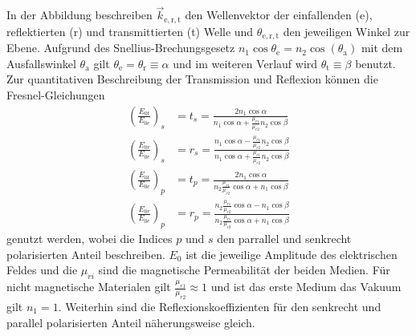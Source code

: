 In der Abbildung beschreiben $\vec{k}_\mathrm{e,r,t}$ den Wellenvektor der einfallenden (e), reflektierten (r) und transmittierten (t) Welle und $\theta_\mathrm{e,r,t}$ den jeweiligen Winkel zur Ebene.
Aufgrund des Snellius-Brechungsgesetz $n_1 \cos {\theta_\mathrm{e}} = n_2 \cos (\theta_\mathrm{a}) $ mit dem Ausfallswinkel $\theta_\mathrm{a}$ gilt $\theta_\mathrm{e} = \theta_\mathrm{r} \equiv \alpha$ und im weiteren Verlauf wird $\theta_\mathrm{t} \equiv \beta$ benutzt. Zur quantitativen Beschreibung der Transmission und Reflexion können die Fresnel-Gleichungen
\begin{align}
  \left( \frac{E_{0t}}{E_{0e}} \right)_{s}&=t_{s}=\frac{2 n _{1}\cos \alpha }{n_{1}\cos \alpha +\frac{\mu _{r1}}{\mu _{r2}}n_{2}\cos \beta }\\
  \left( \frac{E_{0r}}{E_{0e}} \right)_{s}&=r_{s}=\frac{n_{1}\cos \alpha -\frac{\mu _{r1}}{\mu _{r2}}n_{2}\cos \beta }{n_{1}\cos \alpha +\frac{\mu _{r1}}{\mu _{r2}}n_{2}\cos \beta } \\
  \left( \frac{E_{0t}}{E_{0e}} \right)_{p}&=t_{p}=\frac{2n_{1}\cos \alpha }{n_{2}\frac{\mu _{r1}}{\mu _{r2}}\cos \alpha +n_{1}\cos \beta }\\
  \left( \frac{E_{0r}}{E_{0e}} \right)_{p}&=r_{p}=\frac{n_{2}\frac{\mu _{r1}}{\mu _{r2}}\cos \alpha -n_{1}\cos \beta }{n_{2}\frac{\mu _{r1}}{\mu _{r2}}\cos \alpha +n_{1}\cos \beta }
  \label{fresnel}
\end{align}
genutzt werden, wobei die Indices $p$ und $s$ den parrallel und senkrecht polarisierten Anteil beschreiben. $E_0$ ist die jeweilige Amplitude des elektrischen Feldes und die $\mu_{ri}$ sind die magnetische Permeabilität der beiden Medien. Für nicht magnetische Materialen gilt $\frac{\mu_{r1}}{\mu_{r2}} \approx 1$ und ist das erste Medium das Vakuum gilt $n_1 = 1$. Weiterhin sind die Reflexionskoeffizienten für den senkrecht und parallel polarisierten Anteil näherungsweise gleich.
